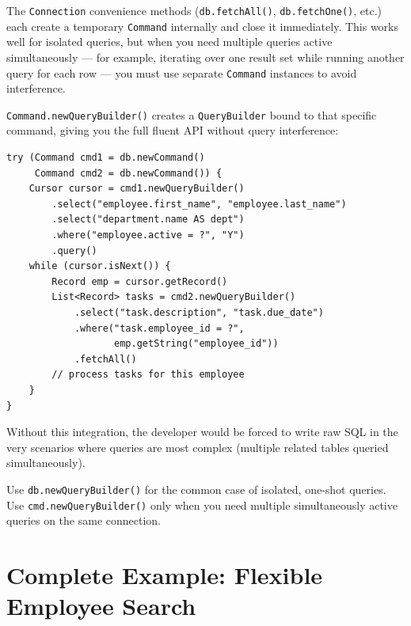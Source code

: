 The \texttt{Connection} convenience methods (\texttt{db.fetchAll()}, \texttt{db.fetchOne()}, etc.) each create a temporary \texttt{Command} internally and close it immediately.  This works well for isolated queries, but when you need multiple queries active simultaneously --- for example, iterating over one result set while running another query for each row --- you must use separate \texttt{Command} instances to avoid interference.

\texttt{Command.newQueryBuilder()} creates a \texttt{QueryBuilder} bound to that specific command, giving you the full fluent API without query interference:

\begin{lstlisting}[style=groovy]
try (Command cmd1 = db.newCommand()
     Command cmd2 = db.newCommand()) {
    Cursor cursor = cmd1.newQueryBuilder()
        .select("employee.first_name", "employee.last_name")
        .select("department.name AS dept")
        .where("employee.active = ?", "Y")
        .query()
    while (cursor.isNext()) {
        Record emp = cursor.getRecord()
        List<Record> tasks = cmd2.newQueryBuilder()
            .select("task.description", "task.due_date")
            .where("task.employee_id = ?",
                   emp.getString("employee_id"))
            .fetchAll()
        // process tasks for this employee
    }
}
\end{lstlisting}

\noindent
Without this integration, the developer would be forced to write raw SQL in the very scenarios where queries are most complex (multiple related tables queried simultaneously).

\begin{tipbox}
Use \texttt{db.newQueryBuilder()} for the common case of isolated, one-shot queries.  Use \texttt{cmd.newQueryBuilder()} only when you need multiple simultaneously active queries on the same connection.
\end{tipbox}

\section{Complete Example: Flexible Employee Search}
\label{sec:qb-example}

